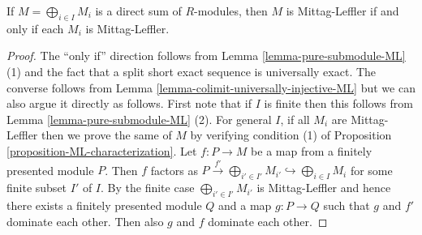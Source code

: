 \begin{lemma}
\label{lemma-direct-sum-ML}
If $M = \bigoplus_{i \in I} M_i$ is a direct sum of $R$-modules, then $M$ is
Mittag-Leffler if and only if each $M_i$ is Mittag-Leffler.
\end{lemma}

\begin{proof}
The ``only if'' direction follows from Lemma \ref{lemma-pure-submodule-ML} (1)
and the fact that a split short exact sequence is universally exact. The
converse follows from Lemma \ref{lemma-colimit-universally-injective-ML}
but we can also argue it directly as follows. First note that if $I$ is
finite then this follows from Lemma
\ref{lemma-pure-submodule-ML} (2).  For general $I$, if all $M_i$ are
Mittag-Leffler then we prove the same of $M$ by verifying condition (1) of
Proposition \ref{proposition-ML-characterization}.
Let $f: P \to M$ be a map from a finitely presented module $P$.
Then $f$ factors as
$P \xrightarrow{f'} \bigoplus_{i' \in I'} M_{i'} \hookrightarrow
\bigoplus_{i \in I} M_i$
for some finite subset $I'$ of $I$.  By the finite case
$\bigoplus_{i' \in I'} M_{i'}$ is Mittag-Leffler and hence there exists
a finitely presented  module $Q$ and a map $g: P \to Q$ such that $g$
and $f'$ dominate each other.  Then also $g$ and $f$ dominate each other.
\end{proof}
